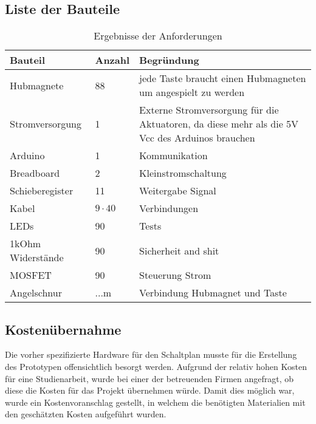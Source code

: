 \subsection{Liste der Bauteile}
\begin{table}[htbp]
    \centering
    \begin{tabular}{|m{3.8cm}|m{1.7cm}|m{8cm}|}
        \hline
        \textbf{Bauteil} &  \textbf{Anzahl} & \textbf{Begründung}  \\
        \hline
        Hubmagnete & 88 & jede Taste braucht einen Hubmagneten um angespielt zu werden \\ %
        \hline
        Stromversorgung & 1 & Externe Stromversorgung für die Aktuatoren, da diese mehr als die 5V Vcc des Arduinos brauchen \\
        \hline
        Arduino & 1 & Kommunikation \\
        \hline
        Breadboard & 2 & Kleinstromschaltung \\
        \hline
        Schieberegister & 11 & Weitergabe Signal\\
        \hline
        Kabel & $9\cdot40$ & Verbindungen \\ %
        \hline
        LEDs & 90 & Tests \\ %
        \hline
        1kOhm Widerstände & 90 & Sicherheit and shit \\
        \hline
        MOSFET & 90 & Steuerung Strom \\
        \hline
        Angelschnur & ...m & Verbindung Hubmagnet und Taste \\ %
        \hline
    \end{tabular}
    \caption{Ergebnisse der Anforderungen}
    \label{table:Bauteile}
\end{table}

\subsection{Kostenübernahme}
Die vorher spezifizierte Hardware für den Schaltplan musste für die Erstellung des Prototypen offensichtlich besorgt werden.
Aufgrund der relativ hohen Kosten für eine Studienarbeit, wurde bei einer der betreuenden Firmen angefragt, ob diese die Kosten für das Projekt übernehmen würde.
Damit dies möglich war, wurde ein Kostenvoranschlag gestellt, in welchem die benötigten Materialien mit den geschätzten Kosten aufgeführt wurden. %

